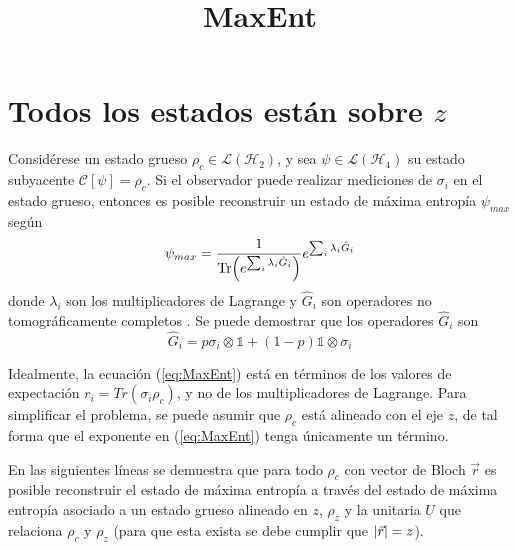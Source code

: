 \documentclass[onecolumn,11pt]{article}
\title{MaxEnt}
\newcommand{\mcL}{\mathcal{L}}
\newcommand{\mcH}{\mathcal{H}}
\newcommand{\mcC}{\mathcal{C}}
\newcommand{\Id}{\mathds{1}}%
\newcommand{\CG}[1]{\mcC\left[#1\right]}
\begin{document}
\maketitle
\thispagestyle{empty}
\section{Todos los estados están sobre $z$}
Considérese un estado grueso $\rho_{c}\in \mcL(\mcH_{2})$, y sea $\psi\in\mcL(\mcH_{4})$ su estado subyacente $\CG{\psi}=\rho_{c}$. Si el observador puede realizar mediciones de $\sigma_{i}$ en el estado grueso, entonces es posible reconstruir un estado de máxima entropía $\psi_{max}$ según
\begin{equation}\label{eq:MaxEnt}
\psi_{max}=\frac{1}{\Tr(e^{\sum_{i}\lambda_{i}\hat{G}_{i}})}e^{\sum_{i}\lambda_{i}\hat{G}_{i}}
\end{equation}
donde $\lambda_{i}$ son los multiplicadores de Lagrange y $\hat{G}_{i}$ son operadores no tomográficamente completos \cite{MaxEnt}. Se puede demostrar que los operadores $\hat{G}_{i}$ son
\begin{equation}\label{eq:Gop}
\hat{G}_{i}=p\sigma_{i}\otimes\Id+(1-p)\Id\otimes\sigma_{i}
\end{equation}

Idealmente, la ecuación (\ref{eq:MaxEnt}) está en términos de los valores de expectación $r_{i}=Tr(\sigma_{i}\rho_{c})$, y no de los multiplicadores de Lagrange. Para simplificar el problema, se puede asumir que $\rho_{c}$ está alineado con el eje $z$, de tal forma que el exponente en (\ref{eq:MaxEnt}) tenga únicamente un término.

\vspace{0.2cm}

En las siguientes líneas se demuestra que para todo $\rho_{c}$ con vector de Bloch $\vec{r}$ es posible reconstruir el estado de máxima entropía a través del estado de máxima entropía asociado a un estado grueso alineado en $z$, $\rho_{z}$ y la unitaria $U$ que relaciona $\rho_{c}$ y $\rho_{z}$ (para que esta exista se debe cumplir que $\abs{\vec{r}}=z$).

\vspace{0.2cm}
\end{document}
